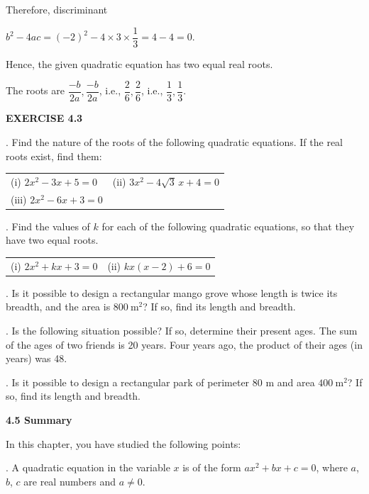 \documentclass[11pt]{article}
\begin{document}
\medskip
Therefore, discriminant

\begin{center}
$b^2 - 4ac = (-2)^2 - 4 \times 3 \times \dfrac{1}{3} = 4 - 4 = 0$.
\end{center}

Hence, the given quadratic equation has two equal real roots.

\medskip
The roots are $\dfrac{-b}{2a}, \dfrac{-b}{2a}$, i.e.,
$\dfrac{2}{6}, \dfrac{2}{6}$, i.e.,
$\dfrac{1}{3}, \dfrac{1}{3}$.
\begin{center}
\textcolor{chapterblue}{\Large\textbf{EXERCISE 4.3}}
\end{center}

. Find the nature of the roots of the following quadratic equations. If the real roots exist, find them:
\medskip
\begin{tabular}{@{}p{} p{}@{}}
(i) $2x^2 - 3x + 5 = 0$ 
& (ii) $3x^2 - 4\sqrt{3}\,x + 4 = 0$ \\[6pt]

(iii) $2x^2 - 6x + 3 = 0$ 
& ~
\end{tabular}

\medskip
{}. Find the values of $k$ for each of the following quadratic equations, so that they have two equal roots.

\medskip
\begin{tabular}{@{}p{} p{}@{}}
(i) $2x^2 + kx + 3 = 0$
& (ii) $kx(x - 2) + 6 = 0$
\end{tabular}

\medskip
{}. Is it possible to design a rectangular mango grove whose length is twice its breadth, and the area is $800\ \text{m}^2$? If so, find its length and breadth.

\medskip
{}. Is the following situation possible? If so, determine their present ages.  
The sum of the ages of two friends is 20 years. Four years ago, the product of their ages (in years) was 48.

\medskip
{}. Is it possible to design a rectangular park of perimeter 80 m and area $400\ \text{m}^2$? If so, find its length and breadth.

\medskip
\noindent
\textcolor{chapterblue}{\large\textbf{4.5 Summary}}

\medskip
\noindent In this chapter, you have studied the following points:

\medskip
{}. A quadratic equation in the variable $x$ is of the form
$ax^2 + bx + c = 0$, where $a$, $b$, $c$ are real numbers and $a \neq 0$.
\end{document}
